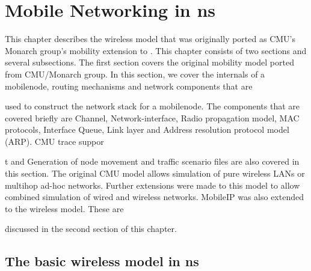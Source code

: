 %
\chapter{Mobile Networking in ns}
\label{chap:mobility}

This chapter describes the wireless model that was originally ported as CMU's Monarch group's mobility extension to \ns. 
This chapter consists of two sections and several subsections. The first section covers the original mobility model ported from CMU/Monarch group. In this section, we cover the internals of a mobilenode, routing mechanisms and network components that are 









used to construct the network stack for a mobilenode. The components that are covered briefly are Channel, Network-interface, Radio propagation model, MAC protocols, Interface Queue, Link layer and Address resolution protocol model (ARP). CMU trace suppor









t and Generation of node movement and traffic scenario files are also covered in this section.
The original CMU model allows simulation of pure wireless LANs or multihop ad-hoc networks. Further extensions were made to this model to allow combined simulation of wired and wireless networks. MobileIP was also extended to the wireless model. These are









 discussed in the second section of this chapter.		


\section{The basic wireless model in ns}
\label{sec:basic-model}

